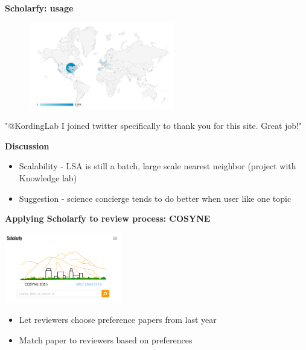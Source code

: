 \begin{frame}{\textbf{Scholarfy: usage}}

\begin{figure}
\includegraphics[width=2.5in]{images/scholarfy_map}\\
\end{figure}

\begin{center}
"@KordingLab I joined twitter specifically to thank you for this site. Great job!"
\end{center}

\end{frame}


\begin{frame}{\textbf{Discussion}}

\begin{itemize}
\item Scalability - LSA is still a batch, large scale nearest neighbor (project with Knowledge lab)
\item Suggestion - science concierge tends to do better when user like one topic
\end{itemize}

\end{frame}


\begin{frame}{\textbf{Applying Scholarfy to review process: COSYNE}}

\begin{center}
\href{http://cosyne.scienceofscience.org/}{\includegraphics[width=2.0in]{images/cosyne}}
\end{center}

\begin{itemize}
\item Let reviewers choose preference papers from last year
\item Match paper to reviewers based on preferences
\end{itemize}

\end{frame}


